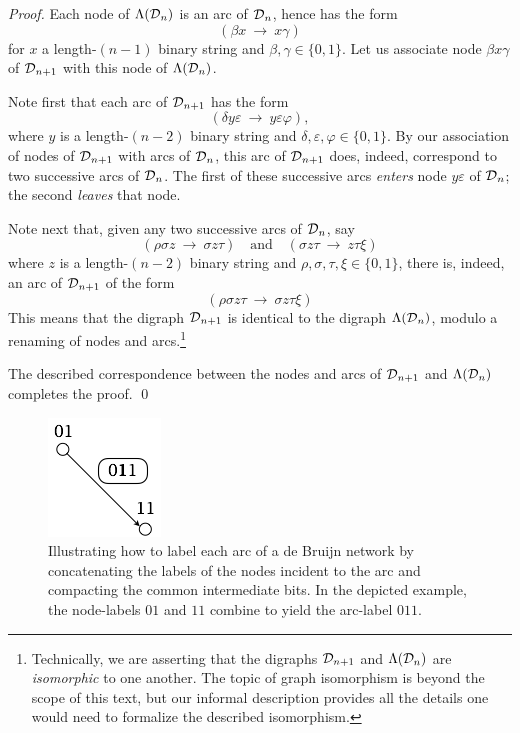 \begin{proof}
Each node of $\Lambda(\mbox{$\cal D$}_n)$ is an arc of $\mbox{$\cal D$}_n$, hence has the form
\[ (\beta x \ \rightarrow \ x \gamma) \]
for $x$ a length-$(n-1)$ binary string and $\beta, \gamma \in
\{0,1\}$.  Let us associate node $\beta x \gamma$ of $\mbox{$\cal D$}_{n+1}$ with
this node of $\Lambda(\mbox{$\cal D$}_n)$.

\smallskip

Note first that each arc of $\mbox{$\cal D$}_{n+1}$ has the form
\[ (\delta y \varepsilon \ \rightarrow \ y \varepsilon \varphi), \]
where $y$ is a length-$(n-2)$ binary string and $\delta, \varepsilon,
\varphi \in \{0,1\}$.  By our association of nodes of $\mbox{$\cal D$}_{n+1}$ with
arcs of $\mbox{$\cal D$}_n$, this arc of $\mbox{$\cal D$}_{n+1}$ does, indeed, correspond to two
successive arcs of $\mbox{$\cal D$}_n$.   The first of these successive arcs
{\em enters} node $y \varepsilon$ of $\mbox{$\cal D$}_n$; the second {\em leaves}
that node.

Note next that, given any two successive arcs of $\mbox{$\cal D$}_n$, say
\[
(\rho \sigma z \ \rightarrow \ \sigma z \tau) \ \ \ \mbox { and } \ \ \
(\sigma z \tau \ \rightarrow \  z \tau \xi)
\]
where $z$ is a length-$(n-2)$ binary string and $\rho, \sigma, \tau,
\xi \in \{0,1\}$, there is, indeed, an arc of $\mbox{$\cal D$}_{n+1}$ of the form
\[ (\rho \sigma z \tau \ \rightarrow \ \sigma z \tau \xi) \]
This means that the digraph $\mbox{$\cal D$}_{n+1}$ is identical to the digraph
$\Lambda(\mbox{$\cal D$}_n)$, modulo a renaming of nodes and arcs.\footnote{Technically,
  we are asserting that the digraphs ${\cal D}_{n+1}$ and ${\Lambda}({\cal D}_n)$ 
  are {\it isomorphic} to one another.  The topic of
  graph isomorphism is beyond the scope of this text, but our informal
  description provides all the details one would need to formalize the
  described isomorphism.}

The described correspondence between the nodes and arcs of $\mbox{$\cal D$}_{n+1}$
and $\Lambda(\mbox{$\cal D$}_n)$ completes the proof.  \qed
\end{proof}

\begin{figure}[hbt]
\begin{center}
       \includegraphics[scale=0.6]{FiguresGraph/dBlabelEdge}
\caption{Illustrating how to label each arc of a de Bruijn network by
  concatenating the labels of the nodes incident to the arc and
  compacting the common intermediate bits.  In the depicted example,
  the node-labels $01$ and $11$ combine to yield the arc-label $011$.}
  \label{fig:dBlabelEdge}
\end{center}
\end{figure}

